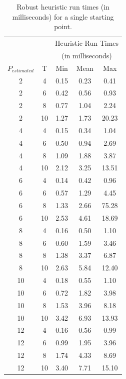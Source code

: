 \documentclass[journal]{IEEEtran}
\begin{document}
\begin{table}[ht]
\centering
\begin{tabular}{cc|ccc}
  \hline
   & & \multicolumn{3}{c}{Heuristic Run Times } \\
   & & \multicolumn{3}{c}{(in milliseconds)}\\
   $P_{estimated}$ & T & Min & Mean & Max \\ 
  \hline
  \hline
  2 & 4 & 0.15 & 0.23 & 0.41 \\ 
  2 & 6 & 0.42 & 0.56 & 0.93 \\ 
  2 & 8 & 0.77 & 1.04 & 2.24 \\ 
  2 & 10 & 1.27 & 1.73 & 20.23 \\ 
  4 & 4 & 0.15 & 0.34 & 1.04 \\ 
  4 & 6 & 0.50 & 0.94 & 2.69 \\ 
  4 & 8 & 1.09 & 1.88 & 3.87 \\ 
  4 & 10 & 2.12 & 3.25 & 13.51 \\ 
  6 & 4 & 0.14 & 0.42 & 0.96 \\ 
  6 & 6 & 0.57 & 1.29 & 4.45 \\ 
  6 & 8 & 1.33 & 2.66 & 75.28 \\ 
  6 & 10 & 2.53 & 4.61 & 18.69 \\ 
  8 & 4 & 0.16 & 0.50 & 1.10 \\ 
  8 & 6 & 0.60 & 1.59 & 3.46 \\ 
  8 & 8 & 1.38 & 3.37 & 6.87 \\ 
  8 & 10 & 2.63 & 5.84 & 12.40 \\ 
  10 & 4 & 0.18 & 0.55 & 1.10 \\ 
  10 & 6 & 0.72 & 1.82 & 3.98 \\ 
  10 & 8 & 1.53 & 3.96 & 8.18 \\ 
  10 & 10 & 3.42 & 6.93 & 13.93 \\ 
  12 & 4 & 0.16 & 0.56 & 0.99 \\ 
  12 & 6 & 0.99 & 1.95 & 3.96 \\ 
  12 & 8 & 1.74 & 4.33 & 8.69 \\ 
  12 & 10 & 3.40 & 7.71 & 15.10 \\ 
   \hline
\end{tabular}
\caption{Robust heuristic run times (in milliseconds) for a single starting point.}
\label{tab:Robust_heuristic_times}
\end{table}
\end{document}
